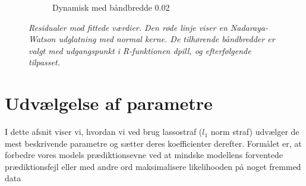 \documentclass[11pt,a4paper]{article}
\begin{document}
\begin{figure}[h!]
\begin{subfigure}[b]{0.425\linewidth}
    \caption{Dynamisk med båndbredde 0.02}
    \label{fig:ResDU}
  \end{subfigure}
  \caption{\textit{Residualer mod fittede værdier. Den røde linje viser en Nadaraya-Watson udglatning med normal kerne. De tilhørende båndbredder er valgt med udgangspunkt i R-funktionen dpill, og efterfølgende tilpasset.}}
  \label{fig:residualplot}
\end{figure}
\clearpage
\section{Udvælgelse af parametre}
I dette afsnit viser vi, hvordan vi ved brug lassostraf ($l_1$ norm straf) udvælger de mest beskrivende parametre og sætter deres koefficienter derefter. Formålet er, at forbedre vores models prædiktionsevne ved at mindske modellens forventede prædiktionsfejl eller med andre ord maksimalisere likelihooden på noget fremmed data\\\\
\end{document}
